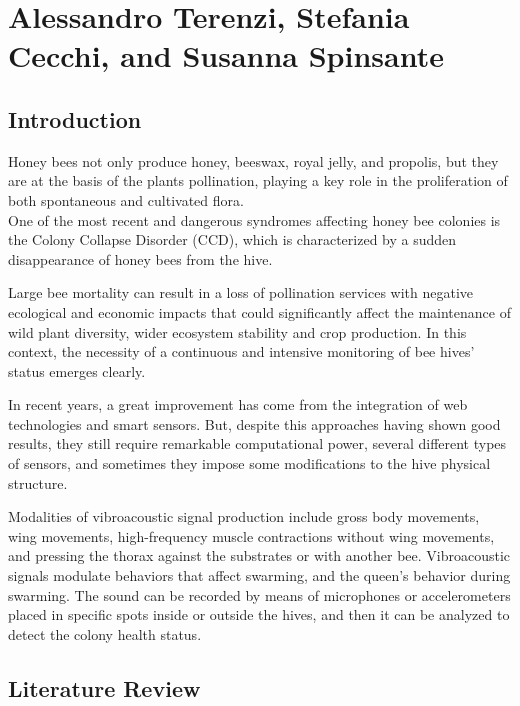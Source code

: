 \documentclass[12pt]{report}
\begin{document}
	\chapter{Alessandro Terenzi, Stefania Cecchi, and Susanna Spinsante}
	
    \section{Introduction}
    
    Honey bees not only produce honey, beeswax, royal jelly, and propolis, but they are at the basis of the plants pollination, playing a key role in the proliferation of both spontaneous and cultivated flora.\\
    One of the most recent and dangerous syndromes affecting honey bee colonies is the Colony Collapse Disorder (CCD), which is characterized by a sudden disappearance of honey bees from the hive.
    
    \par Large bee mortality can result in a loss of pollination services with negative ecological and economic impacts that could significantly affect the maintenance of wild plant diversity, wider ecosystem stability and crop production. In this context, the necessity of a continuous and intensive monitoring of bee hives' status emerges clearly.
    
    \par In recent years, a great improvement has come from the integration of web technologies and smart sensors. But, despite this approaches having shown good results, they still require remarkable computational power, several different types of sensors, and sometimes they impose some modifications to the hive physical structure.
    
    \par Modalities of vibroacoustic signal production include gross body movements, wing movements, high-frequency muscle contractions without wing movements, and pressing the thorax against the substrates or with another bee. Vibroacoustic signals modulate behaviors that affect swarming, and the queen's behavior during swarming. The sound can be recorded by means of microphones or accelerometers placed in specific spots inside or outside the hives, and then it can be analyzed to detect the colony health status.
    
    \section{Literature Review}
	
\end{document}
